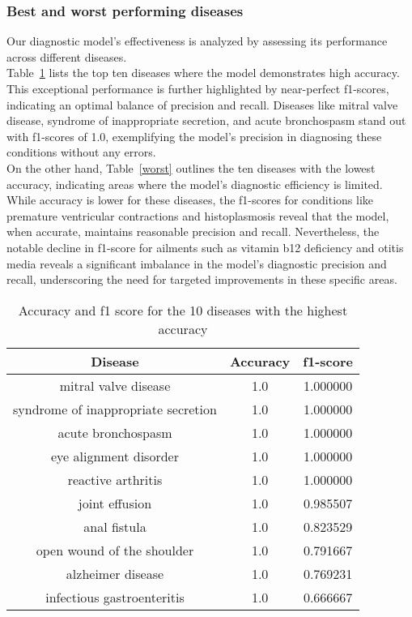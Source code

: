\subsubsection*{Best and worst performing diseases}
Our diagnostic model's effectiveness is analyzed by assessing its performance across different diseases.\\
Table~\ref{best} lists the top ten diseases where the model demonstrates high accuracy.
This exceptional performance is further highlighted by near-perfect f1-scores, indicating an optimal balance of precision and recall.
Diseases like mitral valve disease, syndrome of inappropriate secretion, and acute bronchospasm stand out with f1-scores of 1.0,
exemplifying the model's precision in diagnosing these conditions without any errors.\\
On the other hand, Table~\ref{worst} outlines the ten diseases with the lowest accuracy,
indicating areas where the model's diagnostic efficiency is limited. While accuracy is lower for these diseases,
the f1-scores for conditions like premature ventricular contractions and histoplasmosis reveal that the model,
when accurate, maintains reasonable precision and recall.
Nevertheless, the notable decline in f1-score for ailments such as vitamin b12 deficiency and otitis media reveals a significant imbalance
in the model's diagnostic precision and recall, underscoring the need for targeted improvements in these specific areas.
\begin{table}[H]
	\centering
	\small
	\begin{tabular}{|c|c|c|}
		\hline
		\textbf{Disease}                    & \textbf{Accuracy} & \textbf{f1-score} \\
		\hline
		mitral valve disease                & 1.0               & 1.000000          \\
		syndrome of inappropriate secretion & 1.0               & 1.000000          \\
		acute bronchospasm                  & 1.0               & 1.000000          \\
		eye alignment disorder              & 1.0               & 1.000000          \\
		reactive arthritis                  & 1.0               & 1.000000          \\
		joint effusion                      & 1.0               & 0.985507          \\
		anal fistula                        & 1.0               & 0.823529          \\
		open wound of the shoulder          & 1.0               & 0.791667          \\
		alzheimer disease                   & 1.0               & 0.769231          \\
		infectious gastroenteritis          & 1.0               & 0.666667          \\
		\hline
	\end{tabular}
	\caption{Accuracy and f1 score for the 10 diseases with the highest accuracy}
	\label{best}
\end{table}


